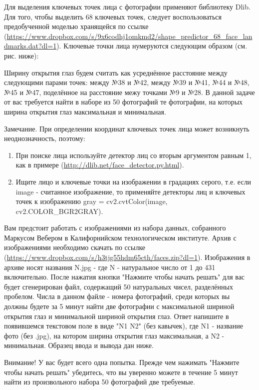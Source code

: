
Для выделения ключевых точек лица с фотографии применяют библиотеку Dlib. Для того, чтобы выделить 68 
ключевых точек, следует воспользоваться предобученной моделью хранящейся по ссылке (\url{https://www.dropbox.com/s/9x6codhj1omkmd2/shape_predictor_68_face_landmarks.dat?dl=1}). Ключевые точки лица нумеруются следующим образом (см. рис. ниже):


Ширину открытия глаз будем считать как усреднённое расстояние между следующими парами точек: между №38 и №42, между №39 и №41, №44 и №48, №45 и №47, поделённое на расстояние межу точками №9 и №28. В данной задаче от вас требуется найти в наборе из 50 фотографий те фотографии, на которых ширина открытия глаз максимальная и минимальная. 

Замечание. При определении координат ключевых точек лица может возникнуть неоднозначность, поэтому:

\begin{enumerate}
    \item При поиске лица используйте детектор лиц со вторым аргументом равным 1, как в примере (\url{http://dlib.net/face_detector.py.html}).
    \item Ищите лицо и ключевые точки на изображении в градациях серого, т.е. если image - считанное 
    изображение, то применяйте детекторы лиц и ключевых точек к изображению gray = cv2.cvtColor(image, cv2.COLOR\_BGR2GRAY).
\end{enumerate}

Вам предстоит работать с изображениями из набора данных, собранного Маркусом Вебером в Калифорнийском 
технологическом институте. Архив с изображениями необходимо скачать по ссылке (\url{https://www.dropbox.com/s/h3tjg55hdm65cth/faces.zip?dl=1}). Изображения в архиве носят названия N.jpg - где N - натуральное число от 1 до 431 включительно. После нажатия кнопки "Нажмите чтобы начать решать" для вас будет сгенерирован файл, содержащий 50 натуральных чисел, разделённых пробелом. Числа в данном файле - номера фотографий, среди которых вы должны будете за 5 минут найти две фотографии с максимальной шириной открытия глаз и минимальной шириной открытия глаз. Ответ напишите в появившемся текстовом поле в виде "N1 N2" (без кавычек), где N1 - название фото (без .jpg), на котором ширина открытия глаз максимальная, а N2 - минимальная. Образец ввода и вывода дан ниже.

Внимание! У вас будет всего одна попытка. Прежде чем нажимать "Нажмите чтобы начать решать" убедитесь, что вы уверенно можете в течение 5 минут найти из произвольного набора 50 фотографий две требуемые.

